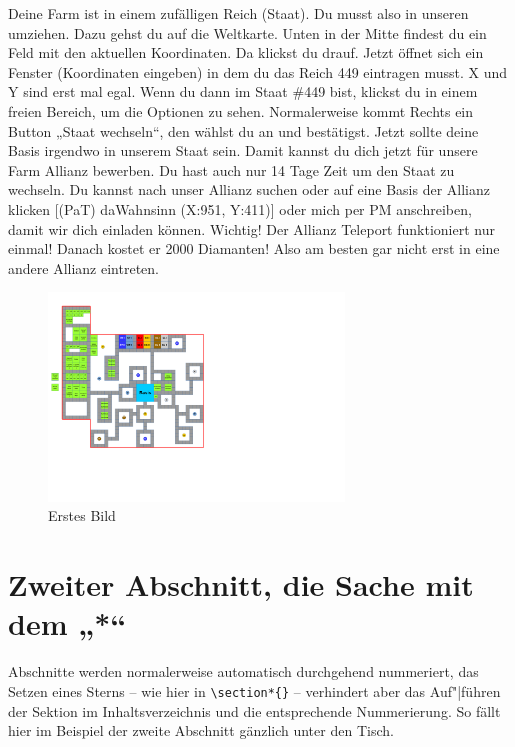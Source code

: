 \documentclass[fontsize=12pt,a4paper,draft]{scrartcl}[2003/01/01]
\begin{document}
Deine Farm ist in einem zufälligen Reich (Staat). Du musst also in unseren umziehen. Dazu gehst du auf die Weltkarte.
Unten in der Mitte findest du ein Feld mit den aktuellen Koordinaten. Da klickst du drauf. Jetzt öffnet sich ein 
Fenster (Koordinaten eingeben) in dem du das Reich 449 eintragen musst. X und Y sind erst mal egal.
Wenn du dann im Staat \#449 bist, klickst du in einem freien Bereich, um die Optionen zu sehen. Normalerweise kommt Rechts ein
Button „Staat wechseln“, den wählst du an und bestätigst.
Jetzt sollte deine Basis irgendwo in unserem Staat sein. Damit kannst du dich jetzt für unsere Farm Allianz bewerben.
Du hast auch nur 14 Tage Zeit um den Staat zu wechseln.
Du kannst nach unser Allianz suchen oder auf eine Basis der Allianz klicken [(PaT) daWahnsinn (X:951, Y:411)] oder mich per PM anschreiben,
damit wir dich einladen können.
Wichtig! Der Allianz Teleport funktioniert nur einmal! Danach kostet er 2000 Diamanten! Also am besten gar nicht erst in eine
andere Allianz eintreten.




\begin{figure}[htbp] 
  \centering
     \includegraphics[width=0.7\textwidth]{map.pdf}
  \caption{Erstes Bild}
  \label{fig:Bild1}
\end{figure}

\section*{Zweiter Abschnitt, die Sache mit dem „*“}
Abschnitte werden normalerweise automatisch durchgehend nummeriert, das Setzen eines Sterns -- wie hier in \verb|\section*{}| -- verhindert aber das Auf"|führen der Sektion im Inhaltsverzeichnis und die entsprechende
Nummerierung. So fällt hier im Beispiel der zweite Abschnitt gänzlich unter den Tisch.
\end{document}
